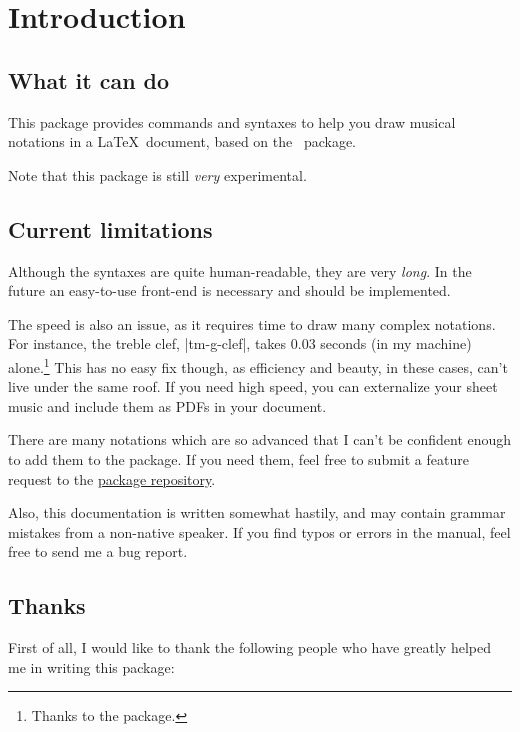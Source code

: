 \section{Introduction}\label{sec:intro}
\subsection{What it can do}\label{sec:intro:intro}
This package provides commands and syntaxes to help you draw musical notations in 
a \LaTeX\ document, based on the \tikzname\ package.

Note that this package is still \emph{very} experimental.
\subsection{Current limitations}\label{sec:intro:limitations}
Although the syntaxes are quite human-readable, they are very \emph{long}. In 
the future an easy-to-use front-end is necessary and should be implemented.

The speed is also an issue, as it requires time to draw many complex notations. 
For instance, the treble clef, |tm-g-clef|, takes $0.03$ seconds (in my machine) 
alone.\footnote{Thanks to the  package.} This has no easy fix 
though, as efficiency and beauty, in these cases, can't live under the same roof. 
If you need high speed, you can externalize your sheet music and include them as 
PDFs in your document.

There are many notations which are so advanced that I can't be confident enough 
to add them to the package. If you need them, feel free to submit a feature 
request to the \href{https://github.com/joulev/tikzmusic}{package repository}. 

Also, this documentation is written somewhat hastily, and may contain grammar 
mistakes from a non-native speaker. If you find typos or errors in the manual, 
feel free to send me a bug report.
\subsection{Thanks}\label{sec:intro:thanks}
First of all, I would like to thank the following people who have greatly 
helped me in writing this package:

